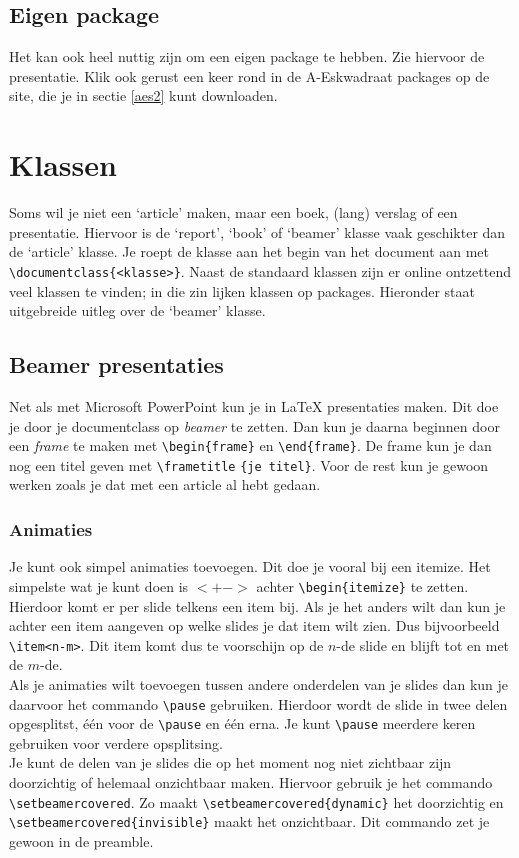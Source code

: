 \documentclass{article}
\begin{document}
\subsection*{Eigen package}
Het kan ook heel nuttig zijn om een eigen package te hebben. Zie hiervoor de presentatie. Klik ook gerust een keer rond in de A-Eskwadraat packages op de site, die je in sectie \ref{aes2} kunt downloaden.

\section{Klassen}
Soms wil je niet een `article' maken, maar een boek, (lang) verslag of een presentatie. Hiervoor is de `report', `book' of `beamer' klasse vaak geschikter dan de `article' klasse. Je roept de klasse aan het begin van het document aan met \verb+\documentclass{<klasse>}+. Naast de standaard klassen zijn er online ontzettend veel klassen te vinden; in die zin lijken klassen op packages. Hieronder staat uitgebreide uitleg over de `beamer' klasse.

\subsection{Beamer presentaties}
Net als met Microsoft PowerPoint kun je in LaTeX presentaties maken. Dit doe je door je documentclass op \emph{beamer} te zetten. Dan kun je daarna beginnen door een \emph{frame} te maken met \verb+\begin{frame}+ en \verb+\end{frame}+. De frame kun je dan nog een titel geven met \verb+\frametitle+ \verb+{je titel}+. Voor de rest kun je gewoon werken zoals je dat met een article al hebt gedaan.
\subsubsection*{Animaties}
Je kunt ook simpel animaties toevoegen. Dit doe je vooral bij een itemize. Het simpelste wat je kunt doen is $<+->$ achter \verb+\begin{itemize}+ te zetten. Hierdoor komt er per slide telkens een item bij. Als je het anders wilt dan kun je achter een item aangeven op welke slides je dat item wilt zien. Dus bijvoorbeeld \verb+\item<n-m>+. Dit item komt dus te voorschijn op de $n$-de slide en blijft tot en met de $m$-de.\\
Als je animaties wilt toevoegen tussen andere onderdelen van je slides dan kun je daarvoor het commando \verb+\pause+ gebruiken. Hierdoor wordt de slide in twee delen opgesplitst, \'e\'en voor de \verb+\pause+ en \'e\'en erna. Je kunt \verb+\pause+ meerdere keren gebruiken voor verdere opsplitsing.\\
Je kunt de delen van je slides die op het moment nog niet zichtbaar zijn doorzichtig of helemaal onzichtbaar maken. Hiervoor gebruik je het commando \verb+\setbeamercovered+. Zo maakt \verb+\setbeamercovered{dynamic}+  het doorzichtig en \verb+\setbeamercovered{invisible}+ maakt het onzichtbaar. Dit commando zet je gewoon in de preamble.
\end{document}

